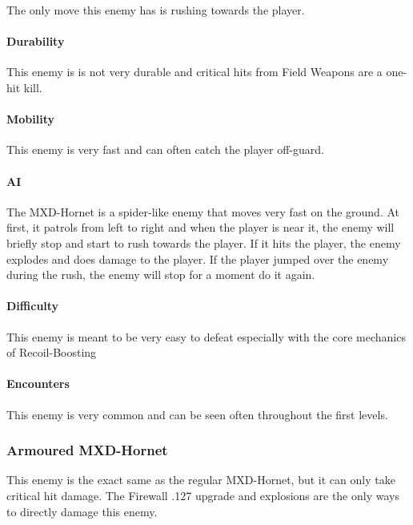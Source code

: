 \documentclass[12pt]{article}
\begin{document}
The only move this enemy has is rushing towards the player.

\paragraph{Durability}

This enemy is is not very durable and critical hits from Field Weapons are a one-hit kill.

\paragraph{Mobility}

This enemy is very fast and can often catch the player off-guard. 

\paragraph{AI}

The MXD-Hornet is a spider-like enemy that moves very fast on the ground. At first, it patrols from left to right and when the player is near it, the enemy will briefly stop and start to rush towards the player. If it hits the player, the enemy explodes and does damage to the player. If the player jumped over the enemy during the rush, the enemy will stop for a moment do it again. 

\paragraph{Difficulty}

This enemy is meant to be very easy to defeat especially with the core mechanics of Recoil-Boosting

\paragraph{Encounters}

This enemy is very common and can be seen often throughout the first levels.

\subsubsection{Armoured MXD-Hornet}

This enemy is the exact same as the regular MXD-Hornet, but it can only take critical hit damage. The Firewall .127 upgrade and explosions are the only ways to directly damage this enemy. 
\end{document}
